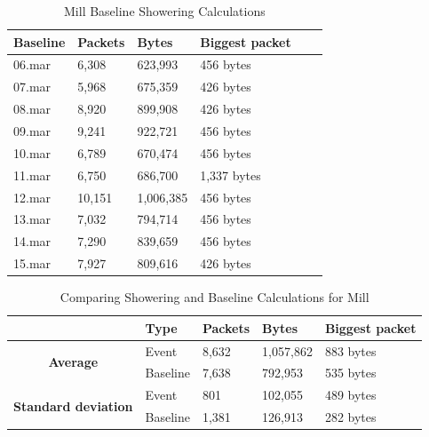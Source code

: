 \begin{table}[H]
    \centering
    \caption{Mill Baseline Showering Calculations}
    \begin{tabular}{|l|l|l|l|l|l|}
    \hline
        \textbf{Baseline} & \textbf{Packets} & \textbf{Bytes} & \textbf{Biggest packet} \\ \hline
        06.mar & 6,308  & 623,993   & 456 bytes \\ \hline
        07.mar & 5,968  & 675,359   & 426 bytes \\ \hline
        08.mar & 8,920  & 899,908   & 426 bytes \\ \hline
        09.mar & 9,241  & 922,721   & 456 bytes \\ \hline
        10.mar & 6,789  & 670,474   & 456 bytes \\ \hline
        11.mar & 6,750  & 686,700   & 1,337 bytes \\ \hline
        12.mar & 10,151 & 1,006,385 & 456 bytes \\ \hline
        13.mar & 7,032  & 794,714   & 456 bytes \\ \hline
        14.mar & 7,290  & 839,659   & 456 bytes \\ \hline
        15.mar & 7,927  & 809,616   & 426 bytes \\ \hline
    \end{tabular}
    \label{tab:MillBaselineShowerCalculations}
\end{table}

\begin{table}[H]
    \centering
    \caption{Comparing Showering and Baseline Calculations for Mill}
    \begin{tabular}{c|l|l|l|l|}
        \cline{2-5}
        \multicolumn{1}{l|}{}                                              & \textbf{Type} & \textbf{Packets} & \textbf{Bytes} & \textbf{Biggest packet} \\ \hline
        \multicolumn{1}{|c|}{\multirow{2}{*}{\textbf{Average}}}            & Event         & 8,632            & 1,057,862       & 883 bytes               \\ \cline{2-5} 
        \multicolumn{1}{|c|}{}                                             & Baseline      & 7,638            & 792,953         & 535 bytes                \\ \hline
        \multicolumn{1}{|c|}{\multirow{2}{*}{\textbf{Standard deviation}}} & Event         & 801              & 102,055         & 489 bytes                 \\ \cline{2-5} 
        \multicolumn{1}{|c|}{}                                             & Baseline      & 1,381            & 126,913       
          &  282 bytes               \\ \hline          
    \end{tabular}
    \label{tab:MillComparingBaselineAndShowerCalculations}
\end{table}

